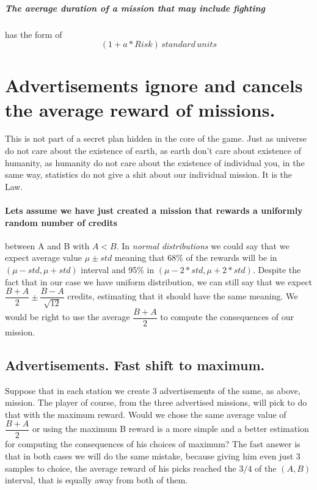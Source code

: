 \documentclass[]{article}
\begin{document}
\subparagraph*{The average duration of a mission that may include fighting} has the form of 
\begin{equation}\label{eq:fight_mission_duration}
	(1+a*Risk) \, standard\, units
\end{equation}

\section{Advertisements ignore and cancels the average reward of missions.} This is not part of a secret plan hidden in the core of the game. Just as universe do not care about the existence of earth, as earth don't care about existence of humanity, as humanity do not care about the existence of individual you, in the same way, statistics do not give a shit about our individual mission. It is the Law.
\paragraph*{Lets assume we have just created a mission that rewards a uniformly random number of credits} between A and B with $A < B$. In \textit{normal distributions} we could say that we expect average value $\mu \pm std$ meaning that 68\% of the rewards will be in $(\mu-std, \mu+std)$ interval and 95\% in $(\mu-2*std, \mu+2*std)$. Despite the fact that in our case we have uniform distribution, we can still say that we expect $\dfrac{B+A}{2}\pm\dfrac{B-A}{\sqrt{12}}$ credits, estimating that it should have the same meaning. We would be right to use the average $\dfrac{B+A}{2}$ to compute the consequences of our mission.
\subsection{Advertisements. Fast shift to maximum.} Suppose that in each station we create 3 advertisements of the same, as above, mission. The player of course, from the three advertised missions, will pick to do that with the maximum reward. Would we chose the same average value of $\dfrac{B+A}{2}$ or using the maximum B reward is a more simple and a better estimation for computing the consequences of his choices of maximum? The fast answer is that in both cases we will do the same mistake, because giving him even just 3 samples to choice, the average reward of his picks reached the $3/4$ of the $(A, B)$ interval, that is equally away from both of them.
\end{document}

